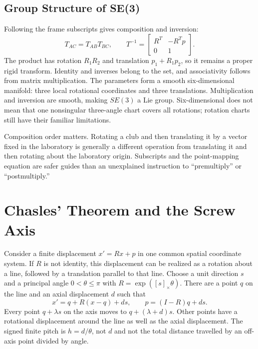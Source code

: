 \subsection{Group Structure of SE(3)}
\label{subsec:se3_group_structure}
\label{thm:se3_lie_group}
\label{princ:se3_composition}

Following the frame subscripts gives composition and inversion:
\begin{equation}
 T_{AC}=T_{AB}T_{BC},\qquad
 T^{-1}=\begin{bmatrix}R^T&-R^Tp\\0&1\end{bmatrix}.
\end{equation}
The product has rotation $R_1R_2$ and translation $p_1+R_1p_2$, so it remains a proper rigid transform. Identity and inverses belong to the set, and associativity follows from matrix multiplication. The parameters form a smooth six-dimensional manifold: three local rotational coordinates and three translations. Multiplication and inversion are smooth, making $SE(3)$ a Lie group. Six-dimensional does not mean that one nonsingular three-angle chart covers all rotations; rotation charts still have their familiar limitations.

Composition order matters. Rotating a club and then translating it by a vector fixed in the laboratory is generally a different operation from translating it and then rotating about the laboratory origin. Subscripts and the point-mapping equation are safer guides than an unexplained instruction to ``premultiply'' or ``postmultiply.''

\section{Chasles' Theorem and the Screw Axis}
\label{sec:chasles_theorem}
\label{def:screw_params}
\label{ex:football_frisbee}
\label{laymans:screwaxis}
\label{thm:chasles}

Consider a finite displacement $x'=Rx+p$ in one common spatial coordinate system. If $R$ is not identity, this displacement can be realized as a rotation about a line, followed by a translation parallel to that line. Choose a unit direction $s$ and a principal angle $0<\theta\leq\pi$ with $R=\exp([s]_\times\theta)$. There are a point $q$ on the line and an axial displacement $d$ such that
\begin{equation}
 x'=q+R(x-q)+ds,\qquad p=(I-R)q+ds.
\end{equation}
Every point $q+\lambda s$ on the axis moves to $q+(\lambda+d)s$. Other points have a rotational displacement around the line as well as the axial displacement. The signed finite pitch is $h=d/\theta$, not $d$ and not the total distance travelled by an off-axis point divided by angle.

